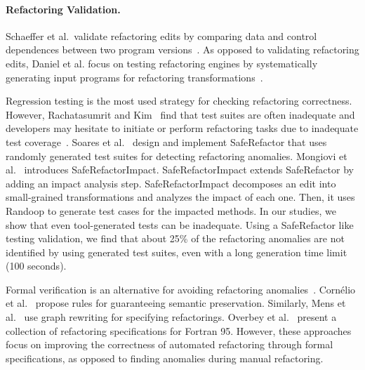 \documentclass[runningheads,a4paper]{llncs}
\begin{document}


\paragraph{Refactoring Validation.} Schaeffer et al.~validate refactoring edits by comparing data and control dependences between two program versions~\cite{Schaefer2010:refactoring}. As opposed to validating refactoring edits, Daniel et al. focus on testing refactoring engines by systematically generating input programs for refactoring transformations~\cite{Brett2007:reftest}. 

Regression testing is the most used strategy for checking refactoring correctness. However, Rachatasumrit and Kim~\cite{rachatasumrit2012empirical} find that test suites are often inadequate and developers may hesitate to initiate or perform refactoring tasks due to inadequate test coverage~\cite{kim2012field}. Soares et al.~\cite{Soares:icse10} design and implement SafeRefactor that uses randomly generated test suites for detecting refactoring anomalies. Mongiovi et al.~\cite{mongiovi2013making} introduces SafeRefactorImpact. SafeRefactorImpact extends SafeRefactor by adding an impact analysis step. SafeRefactorImpact decomposes an edit into small-grained transformations and analyzes the impact of each one. Then, it uses Randoop to generate test cases for the impacted methods. In our studies, we show that even tool-generated tests can be inadequate. Using a SafeRefactor like testing validation, we find that about 25\% of the refactoring anomalies are not identified by using generated test suites, even with a long generation time limit (100 seconds). 

Formal verification is an alternative for avoiding refactoring anomalies~\cite{mens2004survey}. Corn\'elio et al.~\cite{cornelio2010sound} propose rules for guaranteeing semantic preservation. Similarly, Mens et al.~\cite{mens2005formalizing} use graph rewriting for specifying refactorings. Overbey et al.~\cite{overbey2010collection} present a collection of refactoring specifications for Fortran 95. However, these approaches focus on improving the correctness of automated refactoring through formal specifications, as opposed to finding anomalies during manual refactoring. 
\end{document}
